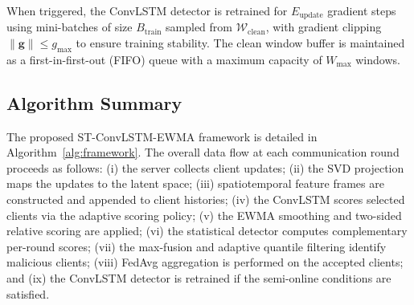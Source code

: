 When triggered, the ConvLSTM detector is retrained for $E_{\text{update}}$ gradient steps using mini-batches of size $B_{\text{train}}$ sampled from $\mathcal{W}_{\text{clean}}$, with gradient clipping $\|\mathbf{g}\| \leq g_{\max}$ to ensure training stability. The clean window buffer is maintained as a first-in-first-out (FIFO) queue with a maximum capacity of $W_{\max}$ windows.

\subsection{Algorithm Summary}\label{subsec:algorithm}

The proposed ST-ConvLSTM-EWMA framework is detailed in Algorithm~\ref{alg:framework}. The overall data flow at each communication round proceeds as follows: (i) the server collects client updates; (ii) the SVD projection maps the updates to the latent space; (iii) spatiotemporal feature frames are constructed and appended to client histories; (iv) the ConvLSTM scores selected clients via the adaptive scoring policy; (v) the EWMA smoothing and two-sided relative scoring are applied; (vi) the statistical detector computes complementary per-round scores; (vii) the max-fusion and adaptive quantile filtering identify malicious clients; (viii) FedAvg aggregation is performed on the accepted clients; and (ix) the ConvLSTM detector is retrained if the semi-online conditions are satisfied.

